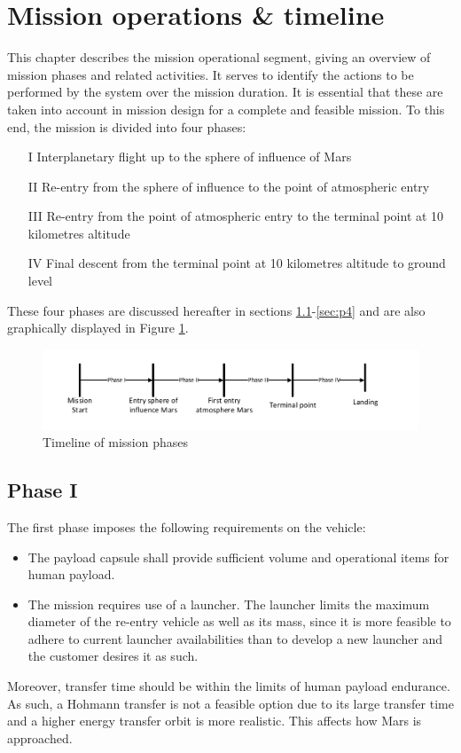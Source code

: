 \section{Mission operations \& timeline}\label{cha:opseg}
This chapter describes the mission operational segment, giving an overview of mission phases and related activities. It serves to identify the actions to be performed by the system over the mission duration. It is essential that these are taken into account in mission design for a complete and feasible mission. To this end, the mission is divided into four phases: 
\begin{itemize}
\item[I]{Interplanetary flight up to the sphere of influence of Mars}
\item[II]{Re-entry from the sphere of influence to the point of atmospheric entry}
\item[III]{Re-entry from the point of atmospheric entry to the terminal point at 10 kilometres altitude}
\item[IV]{Final descent from the terminal point at 10 kilometres altitude to ground level}
\end{itemize}
These four phases are discussed hereafter in sections \ref{sec:p1}-\ref{sec:p4} and are also graphically displayed in Figure  \ref{fig:time}.

\begin{figure}[H]
\centering
\includegraphics[width = 1.0\textwidth]{Figure/OPS.pdf}
\caption{Timeline of mission phases}
\label{fig:time}
\end{figure}

\subsection{Phase I}\label{sec:p1}
The first phase imposes the following requirements on the vehicle:
\begin{itemize}
\item The payload capsule shall provide sufficient volume and operational items for human payload. %
\item  The mission requires use of a launcher. The launcher limits the maximum diameter of the re-entry vehicle as well as its mass, since it is more feasible to adhere to current launcher availabilities than to develop a new launcher and the customer desires it as such.
\end{itemize}
Moreover, transfer time should be within the limits of human payload endurance. As such, a Hohmann transfer is not a feasible option due to its large transfer time and a higher energy transfer orbit is more realistic. This affects how Mars is approached.

